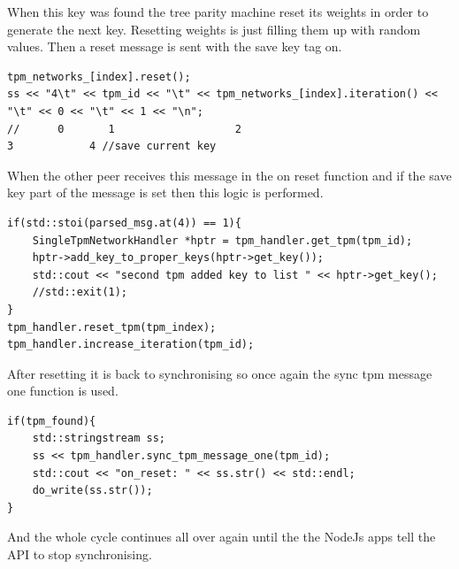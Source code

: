 When this key was found the tree parity machine reset its weights in order to generate the next key. Resetting weights is just filling them up with random values. 
Then a reset message is sent with the save key tag on.
\begin{lstlisting}
tpm_networks_[index].reset();
ss << "4\t" << tpm_id << "\t" << tpm_networks_[index].iteration() << "\t" << 0 << "\t" << 1 << "\n";
//      0       1                   2                                         3            4 //save current key
\end{lstlisting}
When the other peer receives this message in the on reset function and if the save key part of the message is set then this logic is performed.
\begin{lstlisting}
if(std::stoi(parsed_msg.at(4)) == 1){
	SingleTpmNetworkHandler *hptr = tpm_handler.get_tpm(tpm_id);
	hptr->add_key_to_proper_keys(hptr->get_key());
	std::cout << "second tpm added key to list " << hptr->get_key();
	//std::exit(1);
} 
tpm_handler.reset_tpm(tpm_index);
tpm_handler.increase_iteration(tpm_id);
\end{lstlisting}
After resetting it is back to synchronising so once again the sync tpm message one function is used.
\begin{lstlisting}
if(tpm_found){
	std::stringstream ss;
	ss << tpm_handler.sync_tpm_message_one(tpm_id);
	std::cout << "on_reset: " << ss.str() << std::endl;
	do_write(ss.str());
}
\end{lstlisting}
And the whole cycle continues all over again until the the NodeJs apps tell the API to stop synchronising. 


